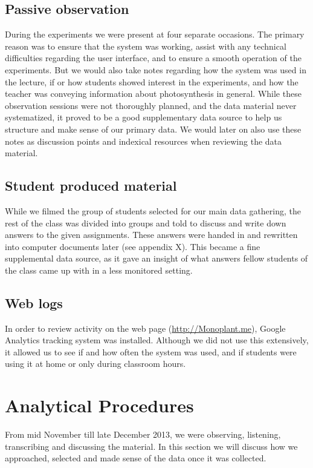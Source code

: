 \subsection{Passive observation}
During the experiments we were present at four separate occasions. The primary reason was to ensure that the system was working, assist with any technical difficulties regarding the user interface, and to ensure a smooth operation of the experiments. But we would also take notes regarding how the system was used in the lecture, if or how students showed interest in the experiments, and how the teacher was conveying information about photosynthesis in general. While these observation sessions were not thoroughly planned, and the data material never systematized, it proved to be a good supplementary data source to help us structure and make sense of our primary data. We would later on also use these notes as discussion points and indexical resources when reviewing the data material. 

\subsection{Student produced material}
While we filmed the group of students selected for our main data gathering, the rest of the class was divided into groups and told to discuss and write down answers to the given assignments. These answers were handed in and rewritten into computer documents later (see appendix X). This became a fine supplemental data source, as it gave an insight of what answers fellow students of the class came up with in a less monitored setting. 

\subsection{Web logs}
In order to review activity on the web page (\url{http://Monoplant.me}), Google Analytics tracking system was installed. Although we did not use this extensively, it allowed us to see if and how often the system was used, and if students were using it at home or only during classroom hours. 

\section{Analytical Procedures}
From mid November till late December 2013, we were observing, listening, transcribing and discussing the material. In this section we will discuss how we approached, selected and made sense of the data once it was collected.



